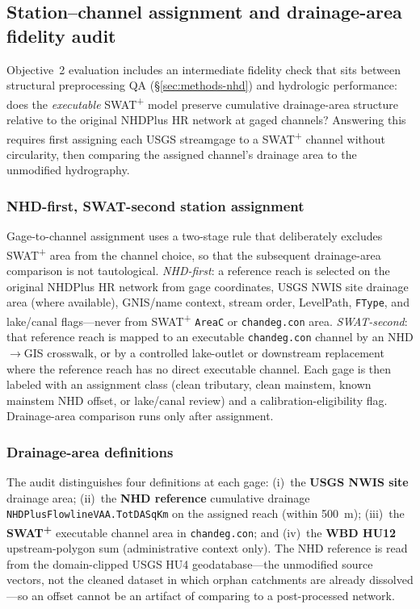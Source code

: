 \subsection{Station--channel assignment and drainage-area fidelity audit}
\label{sec:methods-drainage-audit}

Objective~2 evaluation includes an intermediate fidelity check that sits between structural preprocessing QA (\S\ref{sec:methods-nhd}) and hydrologic performance: does the \emph{executable} SWAT\textsuperscript{+} model preserve cumulative drainage-area structure relative to the original NHDPlus HR network at gaged channels?
Answering this requires first assigning each USGS streamgage to a SWAT\textsuperscript{+} channel without circularity, then comparing the assigned channel's drainage area to the unmodified hydrography.

\subsubsection*{NHD-first, SWAT-second station assignment}
Gage-to-channel assignment uses a two-stage rule that deliberately excludes SWAT\textsuperscript{+} area from the channel choice, so that the subsequent drainage-area comparison is not tautological.
\emph{NHD-first}: a reference reach is selected on the original NHDPlus HR network from gage coordinates, USGS NWIS site drainage area (where available), GNIS/name context, stream order, LevelPath, \texttt{FType}, and lake/canal flags---never from SWAT\textsuperscript{+} \texttt{AreaC} or \texttt{chandeg.con} area.
\emph{SWAT-second}: that reference reach is mapped to an executable \texttt{chandeg.con} channel by an NHD$\rightarrow$GIS crosswalk, or by a controlled lake-outlet or downstream replacement where the reference reach has no direct executable channel.
Each gage is then labeled with an assignment class (clean tributary, clean mainstem, known mainstem NHD offset, or lake/canal review) and a calibration-eligibility flag.
Drainage-area comparison runs only after assignment.

\subsubsection*{Drainage-area definitions}
The audit distinguishes four definitions at each gage: (i)~the \textbf{USGS NWIS site} drainage area; (ii)~the \textbf{NHD reference} cumulative drainage \texttt{NHDPlusFlowlineVAA.TotDASqKm} on the assigned reach (within 500~m); (iii)~the \textbf{SWAT\textsuperscript{+}} executable channel area in \texttt{chandeg.con}; and (iv)~the \textbf{WBD HU12} upstream-polygon sum (administrative context only). The NHD reference is read from the domain-clipped USGS HU4 geodatabase---the unmodified source vectors, not the cleaned dataset in which orphan catchments are already dissolved---so an offset cannot be an artifact of comparing to a post-processed network.

